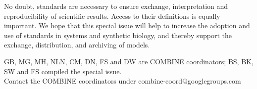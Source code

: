 \documentclass{jib}
\begin{document}
No doubt, standards are necessary to ensure exchange, interpretation and reproducibility of scientific results. 
Access to their definitions is equally important. 
We hope that this special issue will help to increase the adoption and use of standards in systems and synthetic biology, and thereby support the exchange, distribution, and archiving  of models.

\vspace*{1.5cm}

GB, MG, MH, NLN, CM, DN, FS and DW are COMBINE coordinators; BS, BK, SW and FS compiled the special issue. \\
Contact the COMBINE coordinators under combine-coord@googlegroups.com



\end{document}

